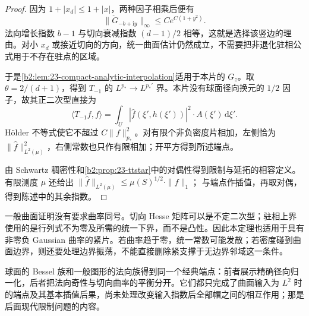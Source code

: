 \begin{proof}
因为 \(1+|x_d|\leq1+|x|\)，两种因子相乘后便有
\[
 \|\check G_{-b+\mathrm iy}\|_\infty
 \leq C e^{C(1+y^2)}.
\]
法向增长指数 \(b-1\) 与切向衰减指数 \((d-1)/2\) 相等，这就是选择该竖边的理由。对小 \(x_d\) 或接近切向的方向，统一曲面估计仍然成立，不需要把非退化驻相公式用于不存在驻点的区域。

于是\cref{b2:lem:23-compact-analytic-interpolation}适用于本片的 \(G_z\)。取 \(\theta=2/(d+1)\)，得到 \(T_{-1}\) 的
\(L^{p_*}\to L^{p_*'}\) 界。本片没有球面径向换元的 \(1/2\) 因子，故其正二次型直接为
\[
 \langle T_{-1}f,f\rangle
 =\int_U|\widehat f(\xi',h(\xi'))|^2
 \cdot A(\xi')\,\mathrm d\xi'.
\]
Hölder 不等式使它不超过 \(C\|f\|_{p_*}^2\)。对有限个非负密度片相加，左侧恰为 \(\|\widehat f\|_{L^2(\mu)}^2\)，右侧常数也只作有限相加；开平方得到所述端点。

由 Schwartz 稠密性和\cref{b2:prop:23-ttstar}中的对偶性得到限制与延拓的相容定义。有限测度 \(\mu\) 还给出
\(\|\widehat f\|_{L^2(\mu)}\leq\mu(S)^{1/2}\cdot\|f\|_1\)；
与端点作插值，再取对偶，得到陈述中的其余指数。
\end{proof}

一般曲面证明没有要求曲率同号。切向 Hesse 矩阵可以是不定二次型；驻相上界使用的是行列式不为零及所需的统一下界，而不是凸性。因此本定理也适用于具有非零负 Gaussian 曲率的紧片。若曲率趋于零，统一常数可能发散；若密度碰到曲面边界，则还要处理边界振荡，不能直接删除紧支撑于无边界邻域这一条件。

\ProseParagraphBreak
球面的 Bessel 族和一般图形的法向族得到同一个经典端点：前者展示精确径向归一化，后者把法向奇性与切向曲率的平衡分开。它们都只完成了曲面输入为 \(L^2\) 时的端点及其基本插值后果，尚未处理改变输入指数后全部帽之间的相互作用；那是后面现代限制问题的内容。

